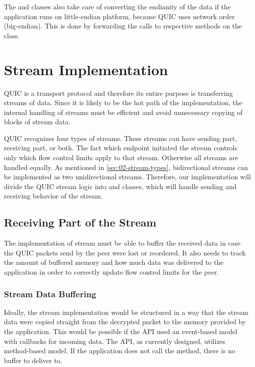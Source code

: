 The \QuicReader{} and \QuicWriter{} classes also take care of converting the endianity of the data
if the application runs on little-endian platform, because QUIC uses network order (big-endian). This is done by forwarding the calls to respective methods on the  class.

\section{Stream Implementation}

QUIC is a transport protocol and therefore its entire purpose is transferring streams of data. Since
it is likely to be the hot path of the implementation, the internal handling of streams must be
efficient and avoid unnecessary copying of blocks of stream data.

QUIC recognizes four types of streams. These streams can have sending part, receiving part, or both.
The fact which endpoint initiated the stream controls only which flow control limits apply to that
stream. Otherwise all streams are handled equally. As mentioned in \autoref{sec:02-stream-types},
bidirectional streams can be implemented as two unidirectional streams. Therefore, our
implementation will divide the QUIC stream logic into \SendStream{} and \ReceiveStream{} classes,
which will handle sending and receiving behavior of the stream.

\subsection{Receiving Part of the Stream}

The implementation of \ReceiveStream{} stream must be able to buffer the received data in case the
QUIC packets send by the peer were lost or reordered. It also needs to track the amount of buffered
memory and how much data was delivered to the application in order to correctly update flow control
limits for the peer.

\subsubsection{Stream Data Buffering}

Ideally, the stream implementation would be structured in a way that the stream data were copied
straight from the decrypted packet to the memory provided by the application. This would be possible
if the API used an event-based model with callbacks for incoming data. The API, as currently
designed, utilizes method-based model. If the application does not call the 
method, there is no buffer to deliver to.

